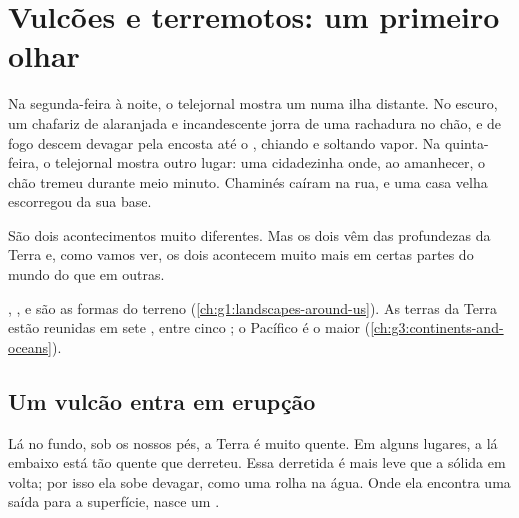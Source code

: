 \chapter{Vulcões e terremotos: um primeiro olhar}\label{ch:g4:volcanoes-earthquakes-first-look}

Na segunda-feira à noite, o telejornal mostra um  numa ilha
distante. No escuro, um chafariz de  alaranjada e incandescente jorra
de uma rachadura no chão, e  de fogo descem devagar pela encosta até
o , chiando e soltando vapor. Na quinta-feira, o telejornal mostra
outro lugar: uma cidadezinha onde, ao amanhecer, o chão tremeu durante
meio minuto. Chaminés caíram na rua, e uma casa velha escorregou da sua base.

São dois acontecimentos muito diferentes. Mas os dois vêm das profundezas
da Terra e, como vamos ver, os dois acontecem muito mais em certas partes
do mundo do que em outras.

\begin{recall}
, ,  e  são as formas do terreno
(\cref{ch:g1:landscapes-around-us}). As terras da Terra estão reunidas em
sete , entre cinco ; o Pacífico é o maior 
(\cref{ch:g3:continents-and-oceans}).
\end{recall}

\section{Um vulcão entra em erupção}

Lá no fundo, sob os nossos pés, a Terra é muito quente. Em alguns lugares,
a  lá embaixo está tão quente que derreteu. Essa  derretida é
mais leve que a  sólida em volta; por isso ela sobe devagar, como uma
rolha na água. Onde ela encontra uma saída para a superfície, nasce um .

